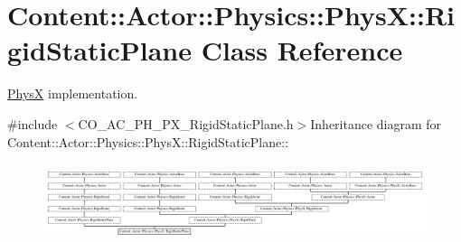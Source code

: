 \hypertarget{classContent_1_1Actor_1_1Physics_1_1PhysX_1_1RigidStaticPlane}{
\section{Content::Actor::Physics::PhysX::RigidStaticPlane Class Reference}
\label{classContent_1_1Actor_1_1Physics_1_1PhysX_1_1RigidStaticPlane}
}


\hyperlink{namespaceContent_1_1Actor_1_1Physics_1_1PhysX}{PhysX} implementation.  


{\ttfamily \#include $<$CO\_\-AC\_\-PH\_\-PX\_\-RigidStaticPlane.h$>$}Inheritance diagram for Content::Actor::Physics::PhysX::RigidStaticPlane::\begin{figure}[H]
\begin{center}
\leavevmode
\includegraphics[height=2.31724cm]{classContent_1_1Actor_1_1Physics_1_1PhysX_1_1RigidStaticPlane}
\end{center}
\end{figure}
